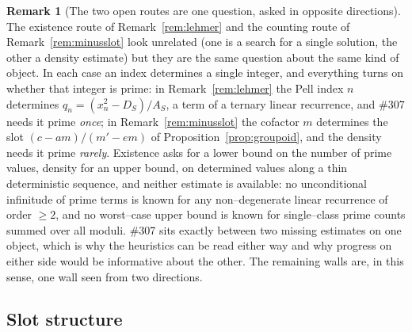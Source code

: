 \documentclass[11pt]{article}
\theoremstyle{definition}
\newtheorem{remark}[theorem]{Remark}
\begin{document}
\begin{remark}[The two open routes are one question, asked in opposite directions]\label{rem:onequestion}
The existence route of Remark~\ref{rem:lehmer} and the counting route of
Remark~\ref{rem:minusslot} look unrelated (one is a search for a single solution, the other a
density estimate) but they are the same question about the same kind of object. In each case an
index determines a single integer, and everything turns on whether that integer is prime: in
Remark~\ref{rem:lehmer} the Pell index $n$ determines $q_n=(x_n^2-D_S)/A_S$, a term of a ternary
linear recurrence, and \#307 needs it prime \emph{once}; in Remark~\ref{rem:minusslot} the cofactor
$m$ determines the slot $(c-am)/(m'-em)$ of Proposition~\ref{prop:groupoid}, and the density needs
it prime \emph{rarely}. Existence asks for a lower bound on the number of prime values, density for
an upper bound, on determined values along a thin deterministic sequence, and neither estimate is
available: no unconditional infinitude of prime terms is known for any non--degenerate linear
recurrence of order $\ge2$, and no worst--case upper bound is known for single--class prime counts
summed over all moduli. \#307 sits exactly between two missing estimates on one object, which is why
the heuristics can be read either way and why progress on either side would be informative about the
other. The remaining walls are, in this sense, one wall seen from two directions.
\end{remark}

\subsection{Slot structure}\label{ssec:slotstructure}
\end{document}
